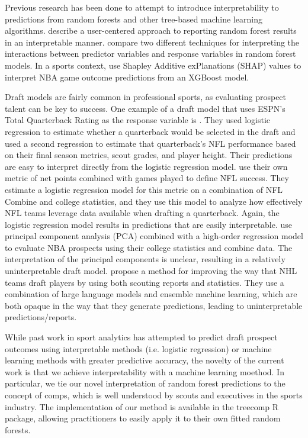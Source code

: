 \documentclass{article}
\begin{document}
Previous research has been done to attempt to introduce interpretability to predictions from random forests and other tree-based machine learning algorithms. \citet{petkovic_improving_2018} describe a user-centered approach to reporting random forest results in an interpretable manner. \citet{aria_comparison_2021} compare two different techniques for interpreting the interactions between predictor variables and response variables in random forest models. In a sports context, \citet{ouyang_integration_2024} use Shapley Additive exPlanations (SHAP) values to interpret NBA game outcome predictions from an XGBoost model.

Draft models are fairly common in professional sports, as evaluating prospect talent can be key to success. One example of a draft model that uses ESPN's Total Quarterback Rating as the response variable is \citet{craig_predicting_2021}. They used logistic regression to estimate whether a quarterback would be selected in the draft and used a second regression to estimate that quarterback's NFL performance based on their final season metrics, scout grades, and player height. Their predictions are easy to interpret directly from the logistic regression model. \citet{wolfson_quarterback_2011} use their own metric of net points combined with games played to define NFL success. They estimate a logistic regression model for this metric on a combination of NFL Combine and college statistics, and they use this model to analyze how effectively NFL teams leverage data available when drafting a quarterback. Again, the logistic regression model results in predictions that are easily interpretable. \citet{berger_jumping_2021} use principal component analysis (PCA) combined with a high-order regression model to evaluate NBA prospects using their college statistics and combine data. The interpretation of the principal components is unclear, resulting in a relatively uninterpretable draft model. \citet{luo_improving_2024} propose a method for improving the way that NHL teams draft players by using both scouting reports and statistics. They use a combination of large language models and ensemble machine learning, which are both opaque in the way that they generate predictions, leading to uninterpretable predictions/reports.

While past work in sport analytics has attempted to predict draft prospect outcomes using interpretable methods (i.e. logistic regression) or machine learning methods with greater predictive accuracy, the novelty of the current work is that we achieve interpretability with a machine learning moethod. In particular, we tie our novel interpretation of random forest predictions to the concept of comps, which is well understood by scouts and executives in the sports industry. The implementation of our method is available in the treecomp R package, allowing practitioners to easily apply it to their own fitted random forests.
\end{document}
